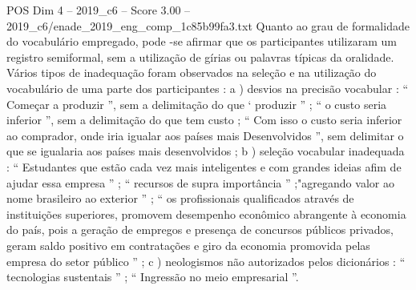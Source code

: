 \begin{textsample}{POS Dim 4 – 2019\_c6 – Score 3.00 – 2019\_c6/enade\_2019\_eng\_comp\_1c85b99fa3.txt}
Quanto ao grau de formalidade do vocabulário empregado, pode -se afirmar que os participantes utilizaram um registro semiformal, sem a utilização de gírias ou palavras típicas da oralidade.
Vários tipos de inadequação foram observados na seleção e na utilização do vocabulário de uma parte dos participantes : a ) desvios na precisão vocabular : “ Começar a produzir ”, sem a delimitação do que ‘ produzir ” ; “ o custo seria inferior ”, sem a delimitação do que tem custo ; “ Com isso o custo seria inferior ao comprador, onde iria igualar aos países mais Desenvolvidos ”, sem delimitar o que se igualaria aos países mais desenvolvidos ; b ) seleção vocabular inadequada : “ Estudantes que estão cada vez mais inteligentes e com grandes ideias afim de ajudar essa empresa ” ; “ recursos de supra importância ” ;"agregando valor ao nome brasileiro ao exterior ” ; “ os profissionais qualificados através de instituições superiores, promovem desempenho econômico abrangente à economia do país, pois a geração de empregos e presença de concursos públicos privados, geram saldo positivo em contratações e giro da economia promovida pelas empresa do setor público ” ; c ) neologismos não autorizados pelos dicionários : “ tecnologias sustentais ” ; “ Ingressão no meio empresarial ”.

\end{textsample}
